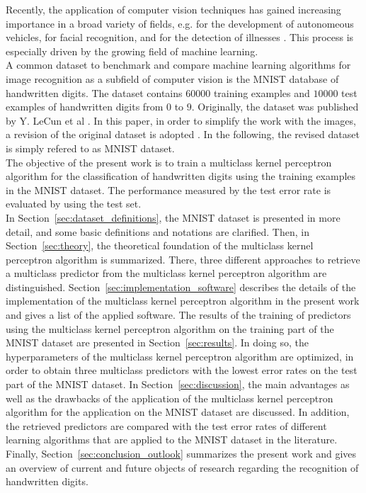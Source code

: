 Recently, the application of computer vision techniques has gained increasing importance in a broad variety of fields, e.g. for the development of autonomeous vehicles, for facial recognition, and for the detection of illnesses \cite{autonomeous2020, emotion2020, medicine2021}. This process is especially driven by the growing field of machine learning. \\

A common dataset to benchmark and compare machine learning algorithms for image recognition as a subfield of computer vision is the MNIST database of handwritten digits. The dataset contains $60000$ training examples and $10000$ test examples of handwritten digits from $0$ to $9$. Originally, the dataset was published by Y. LeCun et al \cite{MNIST}. In this paper, in order to simplify the work with the images, a revision of the original dataset is adopted \cite{KaggleData}. In the following, the revised dataset is simply refered to as MNIST dataset. \\

The objective of the present work is to train a multiclass kernel perceptron algorithm for the classification of handwritten digits using the training examples in the MNIST dataset. The performance measured by the test error rate is evaluated by using the test set.\\

In Section~\ref{sec:dataset_definitions}, the MNIST dataset is presented in more detail, and some basic definitions and notations are clarified. Then, in Section~\ref{sec:theory}, the theoretical foundation of the multiclass kernel perceptron algorithm is summarized. There, three different approaches to retrieve a multiclass predictor from the multiclass kernel perceptron algorithm are distinguished. Section~\ref{sec:implementation_software} describes the details of the implementation of the multiclass kernel perceptron algorithm in the present work and gives a list of the applied software. The results of the training of predictors using the multiclass kernel perceptron algorithm on the training part of the MNIST dataset are presented in Section~\ref{sec:results}. In doing so, the hyperparameters of the multiclass kernel perceptron algorithm are optimized, in order to obtain three multiclass predictors with the lowest error rates on the test part of the MNIST dataset. In Section~\ref{sec:discussion}, the main advantages as well as the drawbacks of the application of the multiclass kernel perceptron algorithm for the application on the MNIST dataset are discussed. In addition, the retrieved predictors are compared with the test error rates of different learning algorithms that are applied to the MNIST dataset in the literature. Finally, Section~\ref{sec:conclusion_outlook} summarizes the present work and gives an overview of current and future objects of research regarding the recognition of handwritten digits.